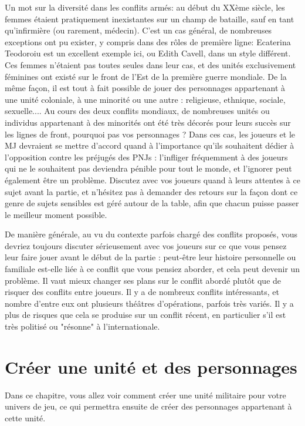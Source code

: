 \documentclass{report}
\begin{document}
\begin{multicols}{2}
Un mot sur la diversité dans les conflits armés: au début du XXème siècle, les femmes étaient pratiquement inexistantes sur un champ de bataille, sauf en tant qu'infirmière (ou rarement, médecin). C'est un cas général, de nombreuses exceptions ont pu exister, y compris dans des rôles de première ligne:  Ecaterina Teodoroiu est un excellent exemple ici, ou  Edith Cavell, dans un style différent. Ces femmes n'étaient pas toutes seules dans leur cas, et des unités exclusivement féminines ont existé sur le front de l'Est de la première guerre mondiale. De la même façon, il est tout à fait possible de jouer des personnages appartenant à une unité coloniale, à une minorité ou une autre : religieuse, ethnique, sociale, sexuelle.... Au cours des deux conflits mondiaux, de nombreuses unités ou individus appartenant à des minorités ont été très décorés pour leurs succès sur les lignes de front, pourquoi pas vos personnages ? Dans ces cas, les joueurs et le MJ devraient se mettre d'accord quand à l'importance qu'ils souhaitent dédier à l'opposition contre les préjugés des PNJs : l'infliger fréquemment à des joueurs qui ne le souhaitent pas deviendra pénible pour tout le monde, et l'ignorer peut également être un problème. Discutez avec vos joueurs quand à leurs attentes à ce sujet avant la partie, et n'hésitez pas à demander des retours sur la façon dont ce genre de sujets sensibles est géré autour de la table, afin que chacun puisse passer le meilleur moment possible. 


De manière générale, au vu du contexte parfois chargé des conflits proposés, vous devriez toujours discuter sérieusement avec vos joueurs sur ce que vous pensez leur faire jouer avant le début de la partie : peut-être leur histoire personnelle ou familiale est-elle liée à ce conflit que vous pensiez aborder, et cela peut devenir un problème. Il vaut mieux changer ses plans sur le conflit abordé plutôt que de risquer des conflits entre joueurs. Il y a de nombreux conflits intéressants, et nombre d'entre eux ont plusieurs théâtres d'opérations, parfois très variés. Il y a plus de risques que cela se produise sur un conflit récent, en particulier s'il est très politisé ou "résonne" à l'internationale.
\chapter{Créer une unité et des personnages}
Dans ce chapitre, vous allez voir comment créer une unité militaire pour votre univers de jeu, ce qui permettra ensuite de créer des personnages appartenant à cette unité.

\end{multicols}
\end{document}
